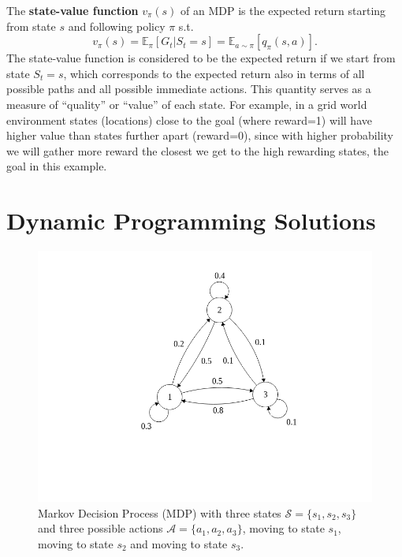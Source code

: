The \textbf{state-value function} $v_{\pi}(s)$ of an MDP is the expected return starting from state $s$ and following policy $\pi$ s.t.
\begin{equation}
    v_{\pi}(s) = \mathbb{E}_{\pi}[G_t | S_t = s] = \mathbb{E}_{a \sim \pi}[q_{\pi}(s,a)] .
\end{equation}
The state-value function is considered to be the expected return if we start from state $S_t=s$, which corresponds to the expected return also in terms of all possible paths and all possible immediate actions. This quantity serves as a measure of ``quality'' or ``value'' of each state. For example, in a grid world environment states (locations) close to the goal (where reward=1) will have higher value than states further apart (reward=0), since with higher probability we will gather more reward the closest we get to the high rewarding states, the goal in this example.
    
\section{Dynamic Programming Solutions}

\begin{figure}[!ht]
\centering
\includegraphics[scale=0.5,trim={0 5cm 0 1cm},clip]{figs/reinforcement_learning/mdp.png}
\caption{Markov Decision Process (MDP) with three states $\mathcal{S}=\{s_1,s_2,s_3\}$ and three possible actions $\mathcal{A}=\{a_1,a_2,a_3\}$, moving to state $s_1$, moving to state $s_2$ and moving to state $s_3$.}
\label{fig:MDP}
\end{figure}

